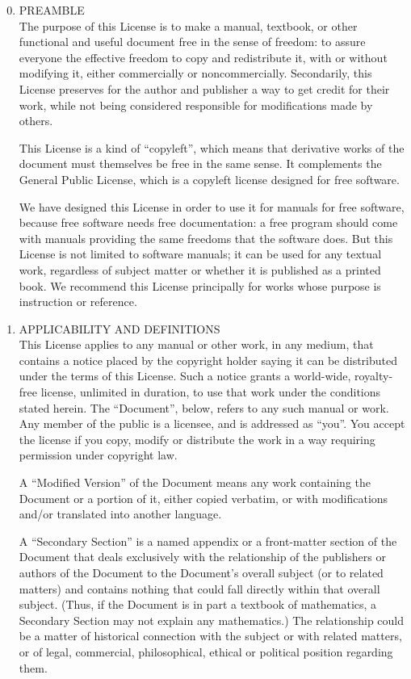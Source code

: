 \begin{enumerate}\setcounter{enumi}{-1}
\item PREAMBLE \\
  The purpose of this License is to make a manual, textbook, or other
  functional and useful document free in the sense of freedom: to
  assure everyone the effective freedom to copy and redistribute it,
  with or without modifying it, either commercially or
  noncommercially.  Secondarily, this License preserves for the author
  and publisher a way to get credit for their work, while not being
  considered responsible for modifications made by others.

  This License is a kind of ``copyleft'', which means that derivative
  works of the document must themselves be free in the same sense.  It
  complements the  General Public License, which is a
  copyleft license designed for free software.

  We have designed this License in order to use it for manuals for
  free software, because free software needs free documentation: a
  free program should come with manuals providing the same freedoms
  that the software does.  But this License is not limited to software
  manuals; it can be used for any textual work, regardless of subject
  matter or whether it is published as a printed book.  We recommend
  this License principally for works whose purpose is instruction or
  reference.

\item APPLICABILITY AND DEFINITIONS \\
  This License applies to any manual or other work, in any medium,
  that contains a notice placed by the copyright holder saying it can
  be distributed under the terms of this License.  Such a notice
  grants a world-wide, royalty-free license, unlimited in duration, to
  use that work under the conditions stated herein.  The ``Document'',
  below, refers to any such manual or work.  Any member of the public
  is a licensee, and is addressed as ``you''.  You accept the license
  if you copy, modify or distribute the work in a way requiring
  permission under copyright law.

  A ``Modified Version'' of the Document means any work containing the
  Document or a portion of it, either copied verbatim, or with
  modifications and/or translated into another language.

  A ``Secondary Section'' is a named appendix or a front-matter
  section of the Document that deals exclusively with the relationship
  of the publishers or authors of the Document to the Document's
  overall subject (or to related matters) and contains nothing that
  could fall directly within that overall subject.  (Thus, if the
  Document is in part a textbook of mathematics, a Secondary Section
  may not explain any mathematics.)  The relationship could be a
  matter of historical connection with the subject or with related
  matters, or of legal, commercial, philosophical, ethical or
  political position regarding them.


\end{enumerate}
